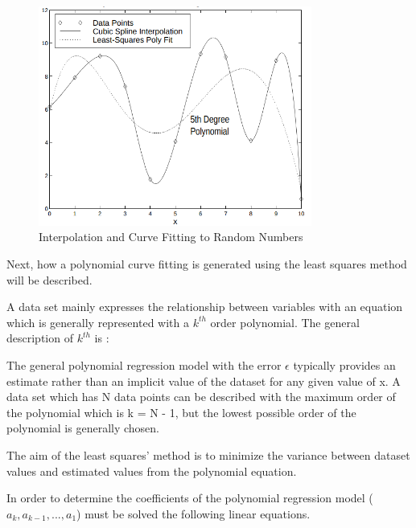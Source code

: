 \begin{figure}[H]
 \centering
  \includegraphics[width=0.8\textwidth]{./Bilder/CurveFittingvsInterpolation.png}
  \caption{Interpolation and Curve Fitting to Random Numbers\cite{Interpolation_and_CurveFitting}}
  \label{Interpolation and Curve Fitting to Random Numbers}
\end{figure}






Next, how a polynomial curve fitting is generated using the least squares method will be described.

A data set mainly expresses the relationship between variables with an equation which is generally represented with a $k^{th}$ order polynomial. The general description of $ k^{th} $ is :

\begin{center}
\end{center}

The general polynomial regression model with the error $\epsilon$ typically provides an estimate rather than an implicit value of the dataset for any given value of x. A data set which has N data points can be described with the maximum order of the polynomial which is k = N - 1, but the lowest possible order of the polynomial is generally chosen.

The aim of the least squares' method is to minimize the variance between dataset values and estimated values from the polynomial equation.

In order to determine the coefficients of the polynomial regression model ($ a_{k}, a_{k-1}, ..., a_{1} $) must be solved the following linear equations.

